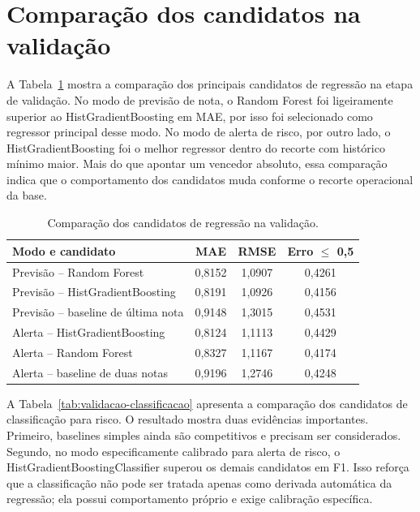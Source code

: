 \section{Compara\c{c}\~ao dos candidatos na valida\c{c}\~ao}
\label{sec:comparacao-candidatos}

A Tabela~\ref{tab:validacao-regressao} mostra a compara\c{c}\~ao dos principais candidatos de regress\~ao na etapa de valida\c{c}\~ao. No modo de previs\~ao de nota, o Random Forest foi ligeiramente superior ao HistGradientBoosting em MAE, por isso foi selecionado como regressor principal desse modo. No modo de alerta de risco, por outro lado, o HistGradientBoosting foi o melhor regressor dentro do recorte com hist\'orico m\'inimo maior. Mais do que apontar um vencedor absoluto, essa compara\c{c}\~ao indica que o comportamento dos candidatos muda conforme o recorte operacional da base.

\begin{table}[ht]
\caption{Compara\c{c}\~ao dos candidatos de regress\~ao na valida\c{c}\~ao.}
\label{tab:validacao-regressao}
\centering
\footnotesize
\begin{tabular}{l c c c}
\hline
\textbf{Modo e candidato} & \textbf{MAE} & \textbf{RMSE} & \textbf{Erro $\leq$ 0,5} \\
\hline
Previs\~ao -- Random Forest & 0,8152 & 1,0907 & 0,4261 \\
Previs\~ao -- HistGradientBoosting & 0,8191 & 1,0926 & 0,4156 \\
Previs\~ao -- baseline de \'ultima nota & 0,9148 & 1,3015 & 0,4531 \\
Alerta -- HistGradientBoosting & 0,8124 & 1,1113 & 0,4429 \\
Alerta -- Random Forest & 0,8327 & 1,1167 & 0,4174 \\
Alerta -- baseline de duas notas & 0,9196 & 1,2746 & 0,4248 \\
\hline
\end{tabular}
\par\smallskip{}\par
\end{table}

A Tabela~\ref{tab:validacao-classificacao} apresenta a compara\c{c}\~ao dos candidatos de classifica\c{c}\~ao para risco. O resultado mostra duas evid\^encias importantes. Primeiro, baselines simples ainda s\~ao competitivos e precisam ser considerados. Segundo, no modo especificamente calibrado para alerta de risco, o HistGradientBoostingClassifier superou os demais candidatos em F1. Isso refor\c{c}a que a classifica\c{c}\~ao n\~ao pode ser tratada apenas como derivada autom\'atica da regress\~ao; ela possui comportamento pr\'oprio e exige calibra\c{c}\~ao espec\'ifica.


